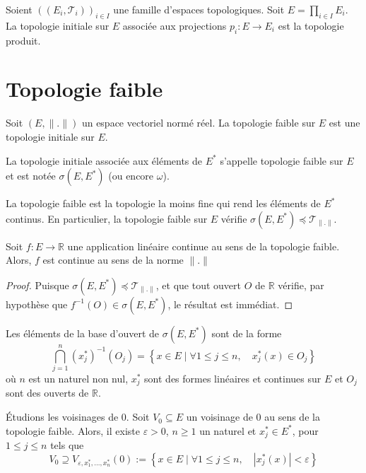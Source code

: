 \begin{ex}
  Soient $((E_i, \mathcal{T}_i))_{i\in I}$ une famille d'espaces topologiques.
  Soit $E = \prod_{i\in I} E_i$. La topologie initiale sur $E$ associée
  aux projections $p_i: E\to E_i$ est la topologie produit.
\end{ex}


\section{Topologie faible}
Soit $(E, \|.\|)$ un espace vectoriel normé réel. La topologie
faible sur $E$ est une topologie initiale sur $E$.
\begin{df}
  La topologie initiale associée aux éléments de $E^*$
  s'appelle topologie faible sur $E$ et est notée $\sigma(E, E^*)$
  (ou encore $\omega$).
\end{df}

La topologie faible est la topologie la moins fine qui rend les
éléments de $E^*$ continus. En particulier, la topologie faible
sur $E$ vérifie $\sigma(E, E^*)\preceq \mathcal{T}_{\|.\|}$.

\begin{lem}
  Soit $f: E\to\mathbb R$ une application linéaire
  continue au sens de la topologie faible. Alors,
  $f$ est continue au sens de la norme $\|.\|$
\end{lem}

\begin{proof}
  Puisque $\sigma(E, E^*)\preceq \mathcal{T}_{\|.\|}$, et
  que tout ouvert $O$ de $\mathbb R$ vérifie, par
  hypothèse que $f^{-1}(O)\in\sigma(E, E^*)$, le
  résultat est immédiat.
\end{proof}

Les éléments de la base d'ouvert de $\sigma(E, E^*)$ sont de la forme
\begin{equation*}
  \bigcap_{j=1}^n (x_j^*)^{-1}(O_j) =
  \left\{ x\in E\mid \forall 1\leq j\leq n,\quad x_j^*(x)\in O_j\right\}
\end{equation*}
où $n$ est un naturel non nul, $x_j^*$ sont des formes linéaires et continues
sur $E$ et $O_j$ sont des ouverts de $\mathbb R$.

\'{E}tudions les voisinages de $0$. Soit $V_0\subseteq E$ un voisinage
de $0$ au sens de la topologie faible. Alors, il existe $\varepsilon > 0$,
$n\geq 1$ un naturel et $x_j^*\in E^*$, pour $1\leq j\leq n$ tels que
\begin{equation*}
  V_0\supseteq V_{\varepsilon, x_1^*, \ldots, x_n^*}(0) :=
  \left\{ x\in E\mid \forall 1\leq j\leq n,\quad
    |x_j^*(x)| < \varepsilon\right\}
\end{equation*}

